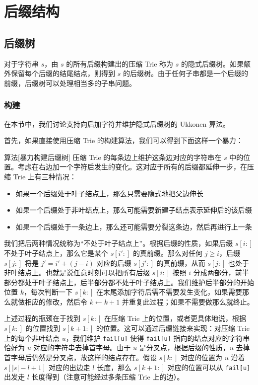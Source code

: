 \chapter{后缀结构}

\section{后缀树}

对于字符串 $s$，由 $s$ 的所有后缀构建出的压缩 Trie 称为 $s$ 的隐式后缀树。如果额外保留每个后缀的结尾结点，则得到 $s$ 的后缀树。由于任何子串都是一个后缀的前缀，后缀树可以处理相当多的子串问题。

\subsection{构建}
在本节中，我们讨论支持向后加字符并维护隐式后缀树的 Ukkonen 算法。

首先，如果直接使用压缩 Trie 的构建算法，我们可以得到下面这样一个暴力：
\begin{descbox}{算法}[暴力构建后缀树]
    压缩 Trie 的每条边上维护这条边对应的字符串在 $s$ 中的位置。考虑在右边加一个字符后发生的变化。这对应于所有的后缀都延伸一步，在压缩 Trie 上有三种情况：
    \begin{itemize}
        \item 如果一个后缀处于叶子结点上，那么只需要隐式地把父边伸长
        \item 如果一个后缀处于非叶结点上，那么可能需要新建子结点表示延伸后的该后缀
        \item 如果一个后缀处于一条边上，那么还可能需要分裂这条边，然后再进行上一条
    \end{itemize}
    我们把后两种情况统称为“不处于叶子结点上”。根据后缀的性质，如果后缀 $s[i:]$ 不处于叶子结点上，那么它是某个 $s[i':]$ 的真前缀。那么对任何 $j\ge i$，后缀 $s[j:]$ 将是 $j'=i'+(j-i)$ 对应的后缀 $s[j':]$ 的真前缀，从而 $s[j:]$ 也处于非叶结点上。也就是说任意时刻可以把所有后缀 $s[i:]$ 按照 $i$ 分成两部分，前半部分都处于叶子结点上，后半部分都不处于叶子结点上。我们维护后半部分的开始位置 $k$，每次判断一下 $s[k:]$ 在末尾添加字符后需不需要发生变化，如果需要那么就做相应的修改，然后令 $k\gets k+1$ 并重复此过程；如果不需要做那么就终止。
\end{descbox}

上述过程的瓶颈在于找到 $s[k:]$ 在压缩 Trie 上的位置，或者更具体地说，根据 $s[k:]$ 的位置找到 $s[k+1:]$ 的位置。这可以通过后缀链接来实现：对压缩 Trie 上的每个非叶结点 $u$，我们维护 \texttt{fail[u]} 使得 \texttt{fail[u]} 指向的结点对应的字符串恰好为 $u$ 对应的字符串去掉首字母。由于 $u$ 是分叉点，根据后缀的性质，$u$ 去掉首字母后仍然是分叉点，故这样的结点存在。假设 $s[k:]$ 对应的位置为 $u$ 沿着 $s[|s|-l+1]$ 对应的出边走 $l$ 长度，那么 $s[k+1:]$ 对应的位置可以从 \texttt{fail[u]} 出发走 $l$ 长度得到（注意可能经过多条压缩 Trie 上的边）。 


